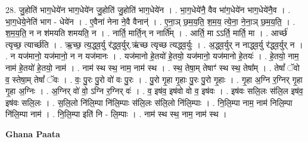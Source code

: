 \documentclass[17pt]{extarticle}
\begin{document}
28. जु॒होति॑ भाग॒धेये॑न भाग॒धेये॑न जु॒होति॑ जु॒होति॑ भाग॒धेये॑न । . भा॒ग॒धेये॑नै॒ वैव भा॑ग॒धेये॑न भाग॒धेये॑नै॒व । . भा॒ग॒धेये॒नेति॑ भाग - धेये॑न । . ए॒वैना॑ नेना ने॒वै वैनान्॑ । . ए॒ना॒ञ् छ॒म॒य॒ति॒ श॒म॒य॒ त्ये॒ना॒ ने॒ना॒ञ् छ॒म॒य॒ति॒ । . श॒म॒य॒ति॒ न न श॑मयति शमयति॒ न । . नार्ति॒ मार्ति॒न् न नार्ति᳚म् । . आर्ति॒ मा ऽऽर्ति॒ मार्ति॒ मा । . आर्च्छ॑ त्यृच्छ॒ त्यार्च्छ॑ति । . ऋ॒च्छ॒ त्य॒द्ध्व॒र्यु र॑द्ध्व॒र्युर्.ऋ॑च्छ त्यृच्छ त्यद्ध्व॒र्युः । . अ॒द्ध्व॒र्युर् न नाद्ध्व॒र्यु र॑द्ध्व॒र्युर् न । . न यज॑मानो॒ यज॑मानो॒ न न यज॑मानः । . यज॑मानो हे॒तयो॑ हे॒तयो॒ यज॑मानो॒ यज॑मानो हे॒तयः॑ । . हे॒तयो॒ नाम॒ नाम॑ हे॒तयो॑ हे॒तयो॒ नाम॑ । . नाम॑ स्थ स्थ॒ नाम॒ नाम॑ स्थ । . स्थ॒ तेषा॒म् तेषाꣳ॑ स्थ स्थ॒ तेषा᳚म् । . तेषां᳚ ॅवो व॒ स्तेषा॒म् तेषां᳚ ॅवः । . वः॒ पु॒रः पु॒रो वो॑ वः पु॒रः । . पु॒रो गृ॒हा गृ॒हाः पु॒रः पु॒रो गृ॒हाः । . गृ॒हा अ॒ग्नि र॒ग्निर् गृ॒हा गृ॒हा अ॒ग्निः । . अ॒ग्निर् वो॑ वो॒ ऽग्नि र॒ग्निर् वः॑ । . व॒ इष॑व॒ इष॑वो वो व॒ इष॑वः । . इष॑वः सलि॒लः स॑लि॒ल इष॑व॒ इष॑वः सलि॒लः । . स॒लि॒लो नि॑लि॒म्पा नि॑लि॒म्पाः स॑लि॒लः स॑लि॒लो नि॑लि॒म्पाः । . नि॒लि॒म्पा नाम॒ नाम॑ निलि॒म्पा नि॑लि॒म्पा नाम॑ । . नि॒लि॒म्पा इति॑ नि - लि॒म्पाः । . नाम॑ स्थ स्थ॒ नाम॒ नाम॑ स्थ । \newline

\textbf{Ghana Paata } \newline
\end{document}
